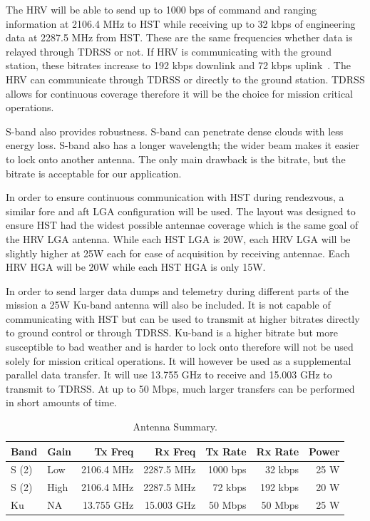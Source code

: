\documentclass[paper=letter, fontsize=11pt]{scrartcl} %
\numberwithin{equation}{section} %
\numberwithin{figure}{section} %
\numberwithin{table}{section} %
\begin{document}
The HRV will be able to send up to 1000 bps of command and ranging information at 2106.4 MHz to HST while receiving up to 32 kbps of engineering data at 2287.5 MHz from HST. These are the same frequencies whether data is relayed through TDRSS or not. If HRV is communicating with the ground station, these bitrates increase to 192 kbps downlink and 72 kbps uplink~\cite{usa2010european}. The HRV can communicate through TDRSS or directly to the ground station. TDRSS allows for continuous coverage therefore it will be the choice for mission critical operations.

S-band also provides robustness. S-band can penetrate dense clouds with less energy loss. S-band also has a longer wavelength; the wider beam makes it easier to lock onto another antenna. The only main drawback is the bitrate, but the bitrate is acceptable for our application.

In order to ensure continuous communication with HST during rendezvous, a similar fore and aft LGA configuration will be used. The layout was designed to ensure HST had the widest possible antennae coverage which is the same goal of the HRV LGA antenna. While each HST LGA is 20W, each HRV LGA will be slightly higher at 25W each for ease of acquisition by receiving antennae. Each HRV HGA will be 20W while each HST HGA is only 15W.

In order to send larger data dumps and telemetry during different parts of the mission a 25W Ku-band antenna will also be included. It is not capable of communicating with HST but can be used to transmit at higher bitrates directly to ground control or through TDRSS. Ku-band is a higher bitrate but more susceptible to bad weather and is harder to lock onto therefore will not be used solely for mission critical operations. It will however be used as a supplemental parallel data transfer. It will use 13.755 GHz to receive and 15.003 GHz to transmit to TDRSS. At up to 50 Mbps, much larger transfers can be performed in short amounts of time.

\begin{table}[H]
\begin{center}
\begin{tabular}{l l r r r r r}
\toprule
Band & Gain & Tx Freq & Rx Freq & Tx Rate & Rx Rate & Power  \\
\midrule
S (2) & Low & 2106.4 MHz & 2287.5 MHz & 1000 bps & 32 kbps & 25 W \\
S (2) & High & 2106.4 MHz & 2287.5 MHz & 72 kbps & 192 kbps & 20 W \\
Ku & NA & 13.755 GHz & 15.003 GHz & 50 Mbps & 50 Mbps & 25 W \\

\bottomrule
\end{tabular}
\end{center}
\caption{Antenna Summary.}
\end{table}
\end{document}
